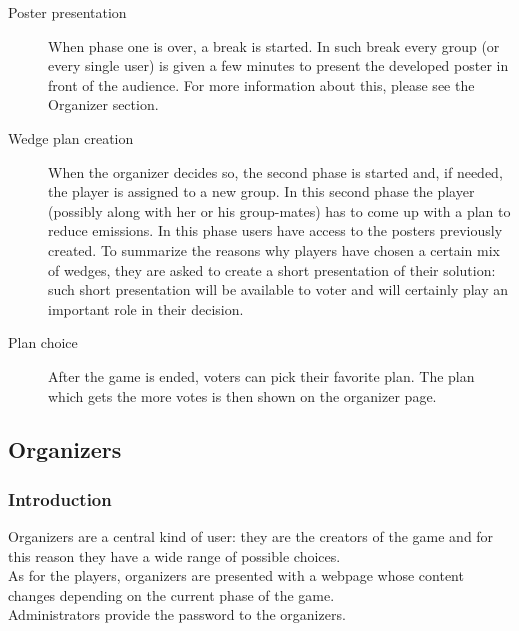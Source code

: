 \begin{description}
	\item[Poster presentation] When phase one is over, a break is started. In such break every group (or every single user) is given a few minutes to present the developed poster in front of the audience. For more information about this, please see the Organizer section.\\
	\item[Wedge plan creation] When the organizer decides so, the second phase is started and, if needed, the player is assigned to a new group. In this second phase the player (possibly along with her or his group-mates) has to come up with a plan to reduce emissions. In this phase users have access to the posters previously created. To summarize the reasons why players have chosen a certain mix of wedges, they are asked to create a short presentation of their solution: such short presentation will be available to voter and will certainly play an important role in their decision.
	\item[Plan choice] After the game is ended, voters can pick their favorite plan. The plan which gets the more votes is then shown on the organizer page.
\end{description}

\subsection{Organizers}
\subsubsection{Introduction}
Organizers are a central kind of user: they are the creators of the game and for this reason they have a wide range of possible choices.\\
As for the players, organizers are presented with a webpage whose content changes depending on the current phase of the game.\\
Administrators provide the password to the organizers.

